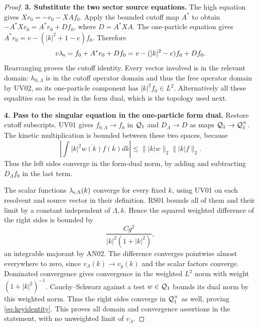 \documentclass[11pt,a4paper]{article}
\theoremstyle{remark}\newtheorem{remark}[theorem]{Remark}
\begin{document}
\begin{proof}
\textbf{3. Substitute the two sector source equations.}
The high equation gives $Xr_0=-r_0-XAf_0$. Apply the bounded cutoff map $A^*$ to obtain
$-A^*Xr_0=A^*r_0+D f_0$, where $D=A^*XA$.
The one-particle equation gives $A^*r_0=v-(|k|^2+1-e)f_0$. Therefore
\[
 v\lambda_{\rm s}=f_0+A^*r_0+D f_0
                 =v-(|k|^2-e)f_0+D f_0.
\]
Rearranging proves the cutoff identity. Every vector involved is in the relevant domain: $h_{0,\Lambda}$ is in the cutoff operator domain and thus the free operator domain by UV02, so its one-particle component has $|k|^2f_0\in L^2$. Alternatively all these equalities can be read in the form dual, which is the topology used next.

\textbf{4. Pass to the singular equation in the one-particle form dual.}
Restore cutoff subscripts. UV01 gives $f_{0,\Lambda}\to f_0$ in $\mathcal Q_1$ and $D_\Lambda\to D$ as maps $\mathcal Q_1\to\mathcal Q_1^{\times}$. The kinetic multiplication is bounded between these two spaces, because
\[
 \left|\int |k|^2\overline{w(k)}f(k)dk\right|
 \leq\||k|w\|_2\||k|f\|_2.
\]
Thus the left sides converge in the form-dual norm, by adding and subtracting $D_\Lambda f_0$ in the last term.

The scalar functions $\lambda_{{\rm s},\Lambda}(k)$ converge for every fixed $k$, using UV01 on each resolvent and source vector in their definition. RS01 bounds all of them and their limit by a constant independent of $\Lambda,k$. Hence the squared weighted difference of the right sides is bounded by
\[
 \frac{C g^2}{|k|^2(1+|k|^2)},
\]
an integrable majorant by AN02. The difference converges pointwise almost everywhere to zero, since $v_\Lambda(k)\to v_g(k)$ and the scalar factors converge. Dominated convergence gives convergence in the weighted $L^2$ norm with weight $(1+|k|^2)^{-1}$. Cauchy--Schwarz against a test $w\in\mathcal Q_1$ bounds its dual norm by this weighted norm. Thus the right sides converge in $\mathcal Q_1^{\times}$ as well, proving \eqref{eq:keyidentity}. This proves all domain and convergence assertions in the statement, with no unweighted limit of $v_\Lambda$.
\end{proof}
\end{document}
